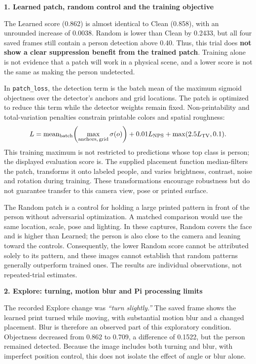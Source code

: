 \documentclass[11pt,letterpaper]{article}
\newcommand{\topic}[1]{\par\smallskip\textbf{#1}\par\nopagebreak}
\begin{document}
\newpage
\topic{1. Learned patch, random control and the training objective}
The Learned score (0.862) is almost identical to Clean (0.858), with an unrounded increase of 0.0038. Random is lower than Clean by 0.2433, but all four saved frames still contain a person detection above 0.40. Thus, this trial does \textbf{not show a clear suppression benefit from the trained patch}. Training alone is not evidence that a patch will work in a physical scene, and a lower score is not the same as making the person undetected.

In \texttt{patch\_loss}, the detection term is the batch mean of the maximum sigmoid objectness over the detector's anchors and grid locations. The patch is optimized to reduce this term while the detector weights remain fixed. Non-printability and total-variation penalties constrain printable colors and spatial roughness:
\[
L = \operatorname{mean}_{\rm batch}\!\left(\max_{\rm anchors,\,grid}\sigma(o)\right)
    +0.01L_{\rm NPS}+\max(2.5L_{\rm TV},0.1).
\]
This training maximum is not restricted to predictions whose top class is person; the displayed evaluation score is. The supplied placement function median-filters the patch, transforms it onto labeled people, and varies brightness, contrast, noise and rotation during training. These transformations encourage robustness but do not guarantee transfer to this camera view, pose or printed surface.

The Random patch is a control for holding a large printed pattern in front of the person without adversarial optimization. A matched comparison would use the same location, scale, pose and lighting. In these captures, Random covers the face and is higher than Learned; the person is also close to the camera and leaning toward the controls. Consequently, the lower Random score cannot be attributed solely to its pattern, and these images cannot establish that random patterns generally outperform trained ones. The results are individual observations, not repeated-trial estimates.

\topic{2. Explore: turning, motion blur and Pi processing limits}
The recorded Explore change was \emph{``turn slightly.''} The saved frame shows the learned print turned while moving, with substantial motion blur and a changed placement. Blur is therefore an observed part of this exploratory condition. Objectness decreased from 0.862 to 0.709, a difference of 0.1522, but the person remained detected. Because the image includes both turning and blur, with imperfect position control, this does not isolate the effect of angle or blur alone.
\end{document}
